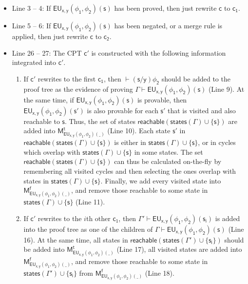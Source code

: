 \begin{itemize}
	\item Line 3 -- 4: If $\mathsf{EU_{x,y}(\phi_1,\phi_2)(s)}$ has been proved, then just rewrite $\mathsf{c}$ to $\mathsf{c_1}$. 
	\item Line 5 -- 6: If $\mathsf{EU_{x,y}(\phi_1,\phi_2)(s)}$ has been negated, or a merge rule is applied, then just rewrite $\mathsf{c}$ to $\mathsf{c_2}$.
	\item Line 26 -- 27: The \textsf{CPT} $\mathsf{c'}$ is constructed with the following information integrated into $\mathsf{c'}$.
	\begin{enumerate}
		\item If $\mathsf{c'}$ rewrites to the first $\mathsf{c_1}$, then $\mathsf{\vdash(s/y)\phi_2}$ should be added to the proof tree as the evidence of proving $\mathsf{\Gamma\vdash EU_{x,y}(\phi_1,\phi_2)(s)}$ (Line 9). At the same time, if $\mathsf{EU_{x,y}(\phi_1,\phi_2)(s)}$ is provable, then $\mathsf{EU_{x,y}(\phi_1,\phi_2)(s')}$ is also provable for each $\mathsf{s'}$ that is visited and also reachable to $\mathsf{s}$. Thus, the set of states $\mathsf{reachable(states(\Gamma)\cup\{s\})}$ are added into $\mathsf{M_{EU_{x,y}(\phi_1,\phi_2)(\_)}^t}$ (Line 10). Each state $\mathsf{s'}$ in $\mathsf{reachable(states(\Gamma)\cup\{s\})}$ is either in $\mathsf{states(\Gamma)\cup\{s\}}$, or in cycles which overlap with $\mathsf{states(\Gamma)\cup\{s\}}$ in some states. The set $\mathsf{reachable(states(\Gamma)\cup\{s\})}$ can thus be calculated on-the-fly by remembering all visited cycles and then selecting the ones overlap with states in $\mathsf{states(\Gamma)\cup\{s\}}$. Finally, we add every visited state into $\mathsf{M_{EU_{x,y}(\phi_1,\phi_2)(\_)}^f}$, and remove those reachable to some state in $\mathsf{states(\Gamma)\cup\{s\}}$ (Line 11).
		\item If $\mathsf{c'}$ rewrites to the $i$th other $\mathsf{c_1}$, then $\mathsf{\Gamma'\vdash EU_{x,y}(\phi_1,\phi_2)(s_i)}$ is added into the proof tree as one of the children of $\mathsf{\Gamma\vdash EU_{x,y}(\phi_1,\phi_2)(s)}$ (Line 16). At the same time, all states in $\mathsf{reachable(states(\Gamma')\cup\{s_i\})}$ should be added into $\mathsf{M_{EU_{x,y}(\phi_1,\phi_2)(\_)}^t}$ (Line 17), all visited states are added into $\mathsf{M_{EU_{x,y}(\phi_1,\phi_2)(\_)}^f}$, and remove those reachable to some state in $\mathsf{states(\Gamma')\cup\{s_i\}}$ from $\mathsf{M_{EU_{x,y}(\phi_1,\phi_2)(\_)}^f}$ (Line 18). 
		

\end{enumerate}
\end{itemize}
